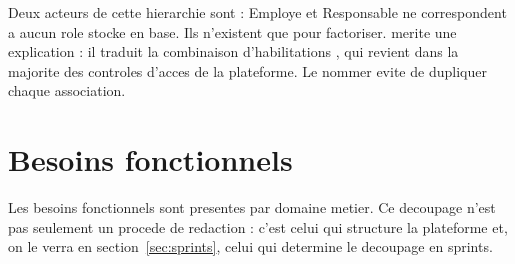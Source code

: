 Deux acteurs de cette hierarchie sont  : Employe et
Responsable ne correspondent a aucun role stocke en base. Ils
n'existent que pour factoriser.  merite une
explication : il traduit la combinaison d'habilitations
, qui revient dans la majorite
des controles d'acces de la plateforme. Le nommer evite de dupliquer
chaque association.

\section{Besoins fonctionnels}
\label{sec:besoins-fonctionnels}

Les besoins fonctionnels sont presentes par domaine metier. Ce decoupage
n'est pas seulement un procede de redaction : c'est celui qui structure
la plateforme et, on le verra en section~\ref{sec:sprints}, celui qui
determine le decoupage en sprints.


